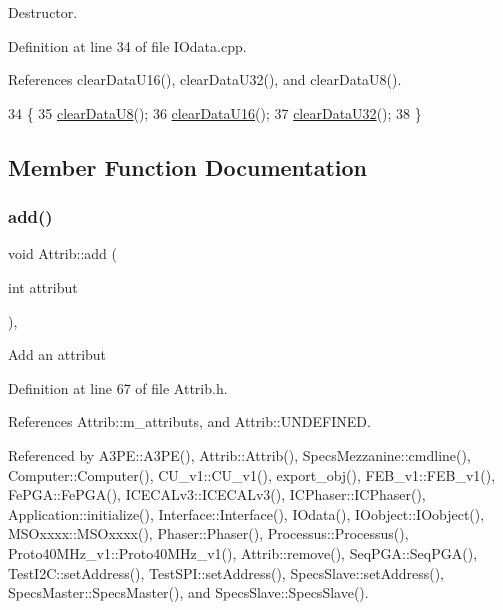 Destructor. 



Definition at line 34 of file I\+Odata.\+cpp.



References clear\+Data\+U16(), clear\+Data\+U32(), and clear\+Data\+U8().


\begin{DoxyCode}
34                 \{
35   \hyperlink{classIOdata_a9bc3ea0458ea6d13bd751ac4c80a4be6}{clearDataU8}();
36   \hyperlink{classIOdata_a13016f489aba6e80cd7be53224c3e8ab}{clearDataU16}();
37   \hyperlink{classIOdata_a848de1b6e7b7207dbb53c102a4d911a9}{clearDataU32}();
38 \}
\end{DoxyCode}


\subsection{Member Function Documentation}
\mbox{\label{classAttrib_a235f773af19c900264a190b00a3b4ad7}} 
\subsubsection{\texorpdfstring{add()}{add()}}
{\footnotesize\ttfamily void Attrib\+::add (\begin{DoxyParamCaption}\item[{int}]{attribut }\end{DoxyParamCaption})\hspace{0.3cm}{\ttfamily [inline]}, {\ttfamily [inherited]}}

Add an attribut 

Definition at line 67 of file Attrib.\+h.



References Attrib\+::m\+\_\+attributs, and Attrib\+::\+U\+N\+D\+E\+F\+I\+N\+ED.



Referenced by A3\+P\+E\+::\+A3\+P\+E(), Attrib\+::\+Attrib(), Specs\+Mezzanine\+::cmdline(), Computer\+::\+Computer(), C\+U\+\_\+v1\+::\+C\+U\+\_\+v1(), export\+\_\+obj(), F\+E\+B\+\_\+v1\+::\+F\+E\+B\+\_\+v1(), Fe\+P\+G\+A\+::\+Fe\+P\+G\+A(), I\+C\+E\+C\+A\+Lv3\+::\+I\+C\+E\+C\+A\+Lv3(), I\+C\+Phaser\+::\+I\+C\+Phaser(), Application\+::initialize(), Interface\+::\+Interface(), I\+Odata(), I\+Oobject\+::\+I\+Oobject(), M\+S\+Oxxxx\+::\+M\+S\+Oxxxx(), Phaser\+::\+Phaser(), Processus\+::\+Processus(), Proto40\+M\+Hz\+\_\+v1\+::\+Proto40\+M\+Hz\+\_\+v1(), Attrib\+::remove(), Seq\+P\+G\+A\+::\+Seq\+P\+G\+A(), Test\+I2\+C\+::set\+Address(), Test\+S\+P\+I\+::set\+Address(), Specs\+Slave\+::set\+Address(), Specs\+Master\+::\+Specs\+Master(), and Specs\+Slave\+::\+Specs\+Slave().


